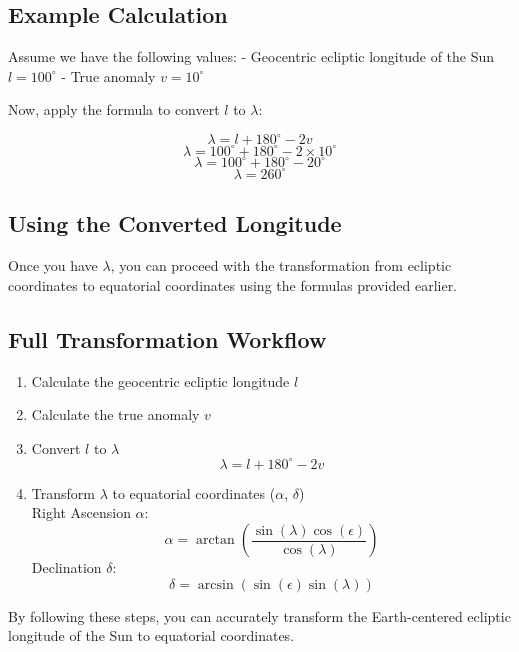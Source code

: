 \documentclass[12pt,a4paper]{article}
\begin{document}
	\subsection{Example Calculation} 
	
	Assume we have the following values:
	- Geocentric ecliptic longitude of the Sun \(l = 100^\circ\)
	- True anomaly \(v = 10^\circ\)
	
	Now, apply the formula to convert \(l\) to \(\lambda\):
	
	\[
	\lambda = l + 180^\circ - 2v
	\]
	\[
	\lambda = 100^\circ + 180^\circ - 2 \times 10^\circ
	\]
	\[
	\lambda = 100^\circ + 180^\circ - 20^\circ
	\]
	\[
	\lambda = 260^\circ
	\]
	
	\subsection{Using the Converted Longitude}
	
	Once you have \(\lambda\), you can proceed with the transformation from ecliptic coordinates to equatorial coordinates using the formulas provided earlier.
	
	\subsection{Full Transformation Workflow}
	
	\begin{enumerate}
		\item Calculate the geocentric ecliptic longitude \(l\)
		\item Calculate the true anomaly \(v\)
		\item Convert \(l\) to \(\lambda\) \\
			\[
				\lambda = l + 180^\circ - 2v
			\]
		\item Transform \(\lambda\) to equatorial coordinates (\(\alpha\), \(\delta\)) \\
			Right Ascension \(\alpha\):
			\[
			\alpha = \arctan \left( \frac{\sin(\lambda) \cos(\epsilon)}{\cos(\lambda)} \right)
			\]
			Declination \(\delta\):
			\[
			\delta = \arcsin (\sin(\epsilon) \sin(\lambda))
			\]
	\end{enumerate}
	
	By following these steps, you can accurately transform the Earth-centered ecliptic longitude of the Sun to equatorial coordinates.
\end{document}
